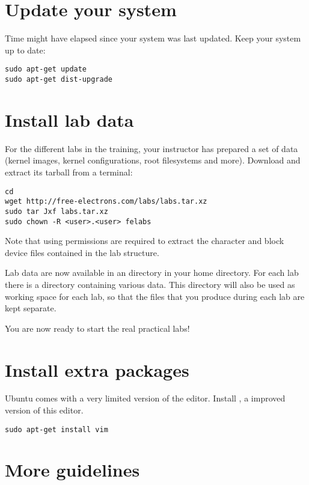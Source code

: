 
\section{Update your system}

Time might have elapsed since your system was last updated. Keep your
system up to date:

\begin{verbatim}
sudo apt-get update
sudo apt-get dist-upgrade
\end{verbatim}

\section{Install lab data}

For the different labs in the training, your instructor has prepared a
set of data (kernel images, kernel configurations, root filesystems
and more). Download and extract its tarball from a terminal:

\begin{verbatim}
cd
wget http://free-electrons.com/labs/labs.tar.xz
sudo tar Jxf labs.tar.xz
sudo chown -R <user>.<user> felabs
\end{verbatim}

Note that using  permissions are required to extract the
character and block device files contained in the lab structure.

Lab data are now available in an  directory in your home
directory. For each lab there is a directory containing various
data. This directory will also be used as working space for each lab,
so that the files that you produce during each lab are kept separate.

You are now ready to start the real practical labs!

\section{Install extra packages}

Ubuntu comes with a very limited version of the 
editor. Install , a improved version of this editor.

\begin{verbatim}
sudo apt-get install vim
\end{verbatim}

\section{More guidelines}

